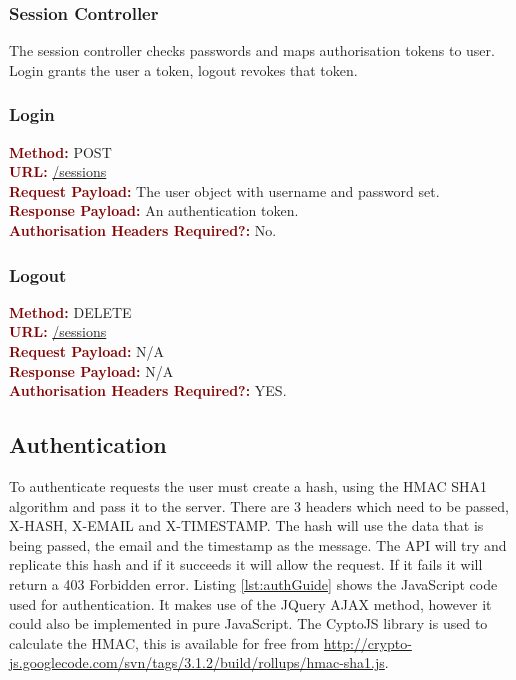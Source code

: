 \documentclass[11pt,a4paper]{report}
\begin{document}
\subsubsection{Session Controller}

The session controller checks passwords and maps authorisation tokens to user. Login grants the user a token, logout revokes that token. 

\subsubsection{Login}
\textbf{\textcolor{Maroon}{Method:}} POST\\
\textbf{\textcolor{Maroon}{URL:}} \url{/sessions}\\
\textbf{\textcolor{Maroon}{Request Payload:}} The user object with username and password set.\\
\textbf{\textcolor{Maroon}{Response Payload:}} An authentication token.\\
\textbf{\textcolor{Maroon}{Authorisation Headers Required?:}} No.

\subsubsection{Logout}
\textbf{\textcolor{Maroon}{Method:}} DELETE\\
\textbf{\textcolor{Maroon}{URL:}} \url{/sessions}\\
\textbf{\textcolor{Maroon}{Request Payload:}} N/A\\
\textbf{\textcolor{Maroon}{Response Payload:}} N/A\\
\textbf{\textcolor{Maroon}{Authorisation Headers Required?:}} YES.

\subsection{Authentication}

To authenticate requests the user must create a hash, using the HMAC SHA1 algorithm and pass it to the server. There are 3 headers which need to be passed, X-HASH, X-EMAIL and X-TIMESTAMP. The hash will use the data that is being passed, the email and the timestamp as the message. The API will try and replicate this hash and if it succeeds it will allow the request. If it fails it will return a 403 Forbidden error. Listing \ref{lst:authGuide} shows the JavaScript code used for authentication. It makes use of the JQuery\cite{jQuery} AJAX method, however it could also be implemented in pure JavaScript. The CyptoJS library is used to calculate the HMAC, this is available for free from \url{http://crypto-js.googlecode.com/svn/tags/3.1.2/build/rollups/hmac-sha1.js}.
\end{document}
